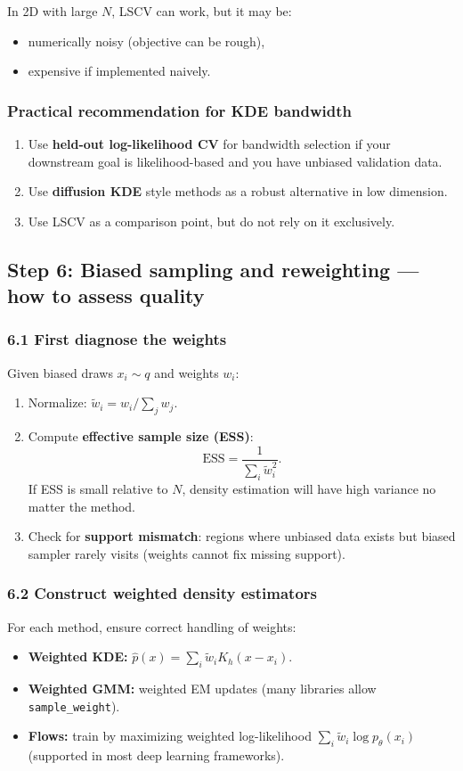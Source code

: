 \documentclass[twocolumn]{notes}
\begin{document}
In 2D with large $N$, LSCV can work, but it may be:
\begin{itemize}[leftmargin=2em]
\item numerically noisy (objective can be rough),
\item expensive if implemented naively.
\end{itemize}

\subsubsection{Practical recommendation for KDE bandwidth}
\begin{enumerate}[leftmargin=2em]
\item Use \textbf{held-out log-likelihood CV} for bandwidth selection if your downstream goal is likelihood-based and you have unbiased validation data.
\item Use \textbf{diffusion KDE} style methods as a robust alternative in low dimension.
\item Use LSCV as a comparison point, but do not rely on it exclusively.
\end{enumerate}

\subsection{Step 6: Biased sampling and reweighting --- how to assess quality}

\subsubsection{6.1 First diagnose the weights}
Given biased draws $x_i\sim q$ and weights $w_i$:
\begin{enumerate}[leftmargin=2em]
\item Normalize: $\tilde w_i = w_i / \sum_j w_j$.
\item Compute \textbf{effective sample size (ESS)}:
\[
\mathrm{ESS} = \frac{1}{\sum_i \tilde w_i^2}.
\]
If ESS is small relative to $N$, density estimation will have high variance no matter the method.
\item Check for \textbf{support mismatch}: regions where unbiased data exists but biased sampler rarely visits (weights cannot fix missing support).
\end{enumerate}

\subsubsection{6.2 Construct weighted density estimators}
For each method, ensure correct handling of weights:
\begin{itemize}[leftmargin=2em]
\item \textbf{Weighted KDE:} $\hat p(x)=\sum_i \tilde w_i K_h(x-x_i)$.
\item \textbf{Weighted GMM:} weighted EM updates (many libraries allow \texttt{sample\_weight}).
\item \textbf{Flows:} train by maximizing weighted log-likelihood $\sum_i \tilde w_i \log p_\theta(x_i)$ (supported in most deep learning frameworks).
\end{itemize}
\end{document}
